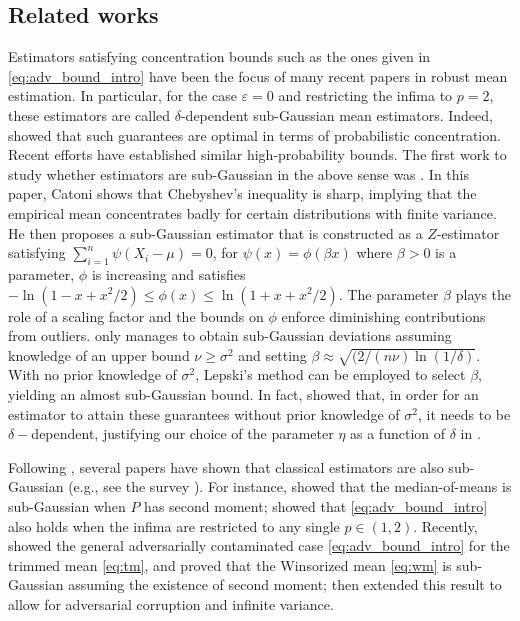 \documentclass{article}
\theoremstyle{plain}
\theoremstyle{definition}
\begin{document}
\subsection{Related works}\label{sec:related_works}

Estimators satisfying concentration bounds such as the ones given in \eqref{eq:adv_bound_intro} have been the focus of many recent papers in robust mean estimation. In particular, for the case \( \varepsilon =0 \) and restricting the infima to \( p=2 \), these estimators are called \( \delta  \)-dependent sub-Gaussian mean estimators. 
Indeed, \cite{devroye2016sub} showed that such guarantees are optimal in terms of probabilistic concentration. Recent efforts have established similar high-probability bounds. The first work to study whether estimators are sub-Gaussian in the above sense was \cite{catoni2012challenging}. In this paper, Catoni shows that Chebyshev's inequality is sharp, implying that the empirical mean concentrates badly for certain distributions with finite variance. He then proposes a sub-Gaussian estimator that is constructed as a $Z$-estimator satisfying $\sum_{i=1}^n \psi( X_i - \mu ) = 0$, for $\psi(x) = \phi(\beta x)$ where $\beta > 0$ is a parameter, $\phi$ is increasing and satisfies $- \ln( 1 - x + x^2/2) \leq \phi(x) \leq \ln( 1 + x + x^2/2)$. The parameter $\beta$ plays the role of a scaling factor and the bounds on $\phi$ enforce diminishing contributions from outliers. \cite{catoni2012challenging} only manages to obtain sub-Gaussian deviations assuming knowledge of an upper bound $\nu \geq \sigma^2$ and setting $\beta \approx \sqrt{(2/(n\nu) \ln (1/\delta)}$. With no prior knowledge of $\sigma^2$, Lepski's method \citep{lepskii1991problem} can be employed to select $\beta$, yielding an almost sub-Gaussian bound. In fact, \cite{devroye2016sub} showed that, in order for an estimator to attain these guarantees without prior knowledge of \( \sigma^2 \), it needs to be \( \delta-  \)dependent, justifying our choice of the parameter \( \eta  \) as a function of \( \delta  \) in .   

Following \cite{catoni2012challenging}, several papers have shown that classical estimators are also sub-Gaussian (e.g., see the survey \cite{lugosi2019mean}). For instance, \cite{lerasle2011robust} showed that the median-of-means \citep{nemirovskij1983problem, jerrum1986random, alon1996space} is sub-Gaussian when $P$ has second moment; \cite{bubeck2013bandits} showed that \eqref{eq:adv_bound_intro} also holds when the infima are restricted to any single \( p \in (1,2) \). Recently, \cite{oliveira2025finite} showed the general adversarially contaminated case \eqref{eq:adv_bound_intro} for the trimmed mean \eqref{eq:tm}, and \cite{lugosi2019mean} proved that the Winsorized mean \eqref{eq:wm} is sub-Gaussian assuming the existence of second moment; \cite{kock2025winsorizedmeanestimationheavy} then extended this result to allow for adversarial corruption and infinite variance.
\end{document}
